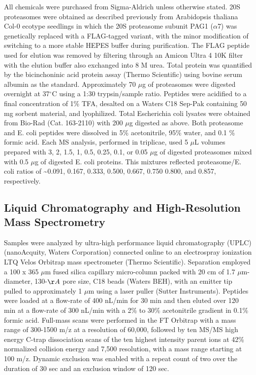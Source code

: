 All chemicals were purchased from Sigma-Aldrich unless otherwise stated.  20S proteasomes were obtained as described previously \citep{book10} from Arabidopsis thaliana Col-0 ecotype seedlings in which the 20S proteasome subunit PAG1 ($\alpha$7) was genetically replaced with a FLAG-tagged variant, with the minor modification of switching to a more stable HEPES buffer during purification.  The FLAG peptide used for elution was removed by filtering through an Amicon Ultra 4 10K filter with the elution buffer also exchanged into 8 M urea.  Total protein was quantified by the bicinchoninic acid protein assay (Thermo Scientific) using bovine serum albumin as the standard.  Approximately 70 $\mu$g of proteasomes were digested overnight at 37$^\circ$C using a 1:30 trypsin/sample ratio.  Peptides were acidified to a final concentration of 1\% TFA, desalted on a Waters C18 Sep-Pak containing 50 mg sorbent material, and lyophilized.  Total Escherichia coli lysates were obtained from Bio-Rad (Cat. 163-2110) with 200 $\mu$g digested as above.  Both proteasome and E. coli peptides were dissolved in 5\% acetonitrile, 95\% water, and 0.1 \% formic acid.  Each MS analysis, performed in triplicae, used 5 $\mu$L volumes prepared with 3, 2, 1.5, 1, 0.5, 0.25, 0.1, or 0.05 $\mu$g of digested proteasomes mixed with 0.5 $\mu$g of digested E. coli proteins.  This mixtures reflected proteasome/E. coli ratios of \textasciitilde0.091, 0.167, 0.333, 0.500, 0.667, 0.750 0.800, and 0.857, respectively.

\subsection{Liquid Chromatography and High-Resolution Mass Spectrometry}

Samples were analyzed by ultra-high performance liquid chromatography (UPLC) (nanoAcquity, Waters Corporation) connected online to an electrospray ionization LTQ Velos Orbitrap mass spectrometer (Thermo Scientific).  Separation employed a 100 x 365 $\mu$m fused silica capillary micro-column packed with 20 cm of 1.7 $\mu$m-diameter, 130-$\AA$ pore size, C18 beads (Waters BEH), with an emitter tip pulled to approximately 1 $\mu$m using a laser puller (Sutter Instruments).  Peptides were loaded at a flow-rate of 400 nL/min for 30 min and then eluted over 120 min at a flow-rate of 300 nL/min with a 2\% to 30\% acetonitrile gradient in 0.1\% formic acid.  Full-mass scans were performed in the FT Orbitrap with a mass range of 300-1500 m/z at a resolution of 60,000, followed by ten MS/MS high energy C-trap dissociation scans of the ten highest intensity parent ions at 42\% normalized collision energy and 7,500 resolution, with a mass range starting at 100 m/z.  Dynamic exclusion was enabled with a repeat count of two over the duration of 30 sec and an exclusion window of 120 sec.  

